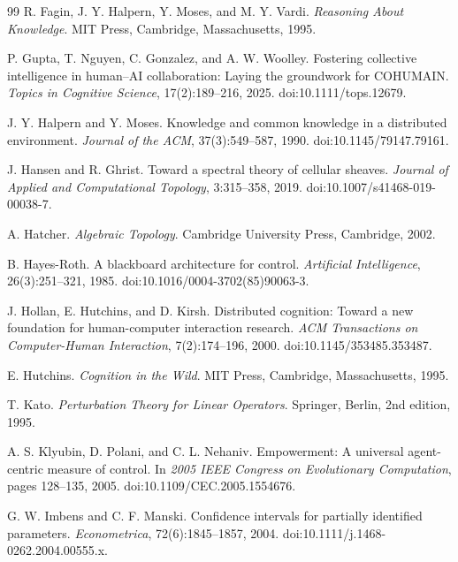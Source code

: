 \documentclass[11pt,oneside,openany]{book}
\numberwithin{equation}{section}
\begin{document}
\begin{thebibliography}{99}
R. Fagin, J. Y. Halpern, Y. Moses, and M. Y. Vardi.
\newblock \emph{Reasoning About Knowledge}.
\newblock MIT Press, Cambridge, Massachusetts, 1995.

P. Gupta, T. Nguyen, C. Gonzalez, and A. W. Woolley.
\newblock Fostering collective intelligence in human--AI collaboration: Laying the groundwork for COHUMAIN.
\newblock \emph{Topics in Cognitive Science}, 17(2):189--216, 2025.
\newblock doi:10.1111/tops.12679.

J. Y. Halpern and Y. Moses.
\newblock Knowledge and common knowledge in a distributed environment.
\newblock \emph{Journal of the ACM}, 37(3):549--587, 1990.
\newblock doi:10.1145/79147.79161.

J. Hansen and R. Ghrist.
\newblock Toward a spectral theory of cellular sheaves.
\newblock \emph{Journal of Applied and Computational Topology}, 3:315--358, 2019.
\newblock doi:10.1007/s41468-019-00038-7.

A. Hatcher.
\newblock \emph{Algebraic Topology}.
\newblock Cambridge University Press, Cambridge, 2002.

B. Hayes-Roth.
\newblock A blackboard architecture for control.
\newblock \emph{Artificial Intelligence}, 26(3):251--321, 1985.
\newblock doi:10.1016/0004-3702(85)90063-3.

J. Hollan, E. Hutchins, and D. Kirsh.
\newblock Distributed cognition: Toward a new foundation for human-computer interaction research.
\newblock \emph{ACM Transactions on Computer-Human Interaction}, 7(2):174--196, 2000.
\newblock doi:10.1145/353485.353487.

E. Hutchins.
\newblock \emph{Cognition in the Wild}.
\newblock MIT Press, Cambridge, Massachusetts, 1995.

T. Kato.
\newblock \emph{Perturbation Theory for Linear Operators}.
\newblock Springer, Berlin, 2nd edition, 1995.

A. S. Klyubin, D. Polani, and C. L. Nehaniv.
\newblock Empowerment: A universal agent-centric measure of control.
\newblock In \emph{2005 IEEE Congress on Evolutionary Computation}, pages 128--135, 2005.
\newblock doi:10.1109/CEC.2005.1554676.

G. W. Imbens and C. F. Manski.
\newblock Confidence intervals for partially identified parameters.
\newblock \emph{Econometrica}, 72(6):1845--1857, 2004.
\newblock doi:10.1111/j.1468-0262.2004.00555.x.


\end{thebibliography}
\end{document}
